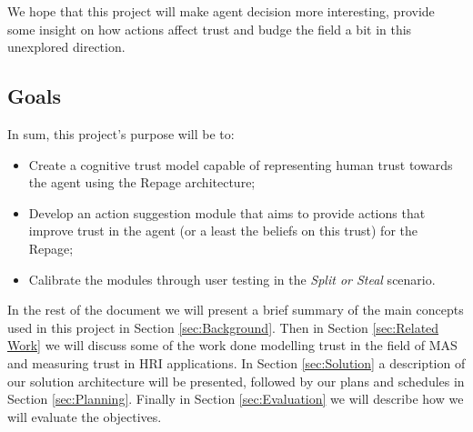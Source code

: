 We hope that this project will make agent decision more interesting, provide some insight on how actions affect trust and budge the field a bit in this unexplored direction.


\subsection{Goals}
\label{subsec:Goals}

In sum, this project's purpose will be to:
\begin{itemize}
	\item Create a cognitive trust model capable of representing human trust towards the agent using the Repage architecture;
	\item Develop an action suggestion module that aims to provide actions that improve trust in the agent (or a least the beliefs on this trust) for the Repage;
	\item Calibrate the modules through user testing in the \textit{Split or Steal} scenario.
\end{itemize}


In the rest of the document we will present a brief summary of the main concepts used in this project in Section  \ref{sec:Background}. Then in Section \ref{sec:Related Work} we will discuss some of the work done modelling trust in the field of \ac{MAS} and measuring trust in \ac{HRI} applications. In Section \ref{sec:Solution} a description of our solution architecture will be presented, followed by our plans and schedules in Section \ref{sec:Planning}. Finally in Section \ref{sec:Evaluation} we will describe how we will evaluate the objectives.


